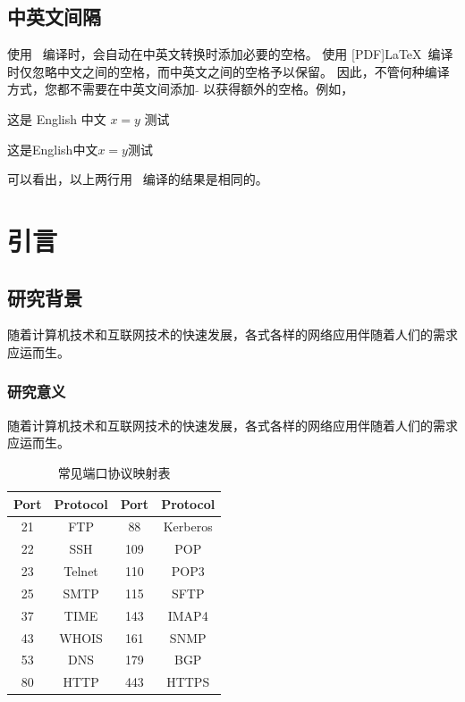 \section{中英文间隔}

使用 \XeLaTeX\ 编译时，会自动在中英文转换时添加必要的空格。 使用 [PDF]\LaTeX\
编译时仅忽略中文之间的空格，而中英文之间的空格予以保留。
因此，不管何种编译方式，您都不需要在中英文间添加 $\tilde{}$ 以获得额外的空格。例如，

这是 English 中文 $x=y$ 测试

这是English中文$x=y$测试

可以看出，以上两行用 \XeLaTeX\ 编译的结果是相同的。




\chapter{引言}

\section{研究背景}

随着计算机技术和互联网技术的快速发展\cite{Nadkarni-1992}，各式各样的网络应用伴随着人们的需求应运而生\cite{Hua-Wang-1973}。

\subsection{研究意义}

随着计算机技术和互联网技术的快速发展\cite{Nadkarni-1992}，各式各样的网络应用伴随着人们的需求应运而生\cite{Hua-Wang-1973}。

\begin{table} [thb]
	\caption{常见端口协议映射表}\label{tab:21}
	\small
	\centering
	{
		\begin{tabular}{cccc}
			\toprule
			Port & Protocol & Port & Protocol\\
			\midrule
			21 & FTP & 88 & Kerberos\\
			22 & SSH & 109 & POP\\
			23 & Telnet & 110 & POP3\\
			25 & SMTP & 115 & SFTP\\
			37 & TIME & 143 & IMAP4\\
			43 & WHOIS & 161 & SNMP\\
			53 & DNS & 179 & BGP\\
			80 & HTTP & 443 & HTTPS\\
			
			\bottomrule
		\end{tabular}
	}
\end{table}

